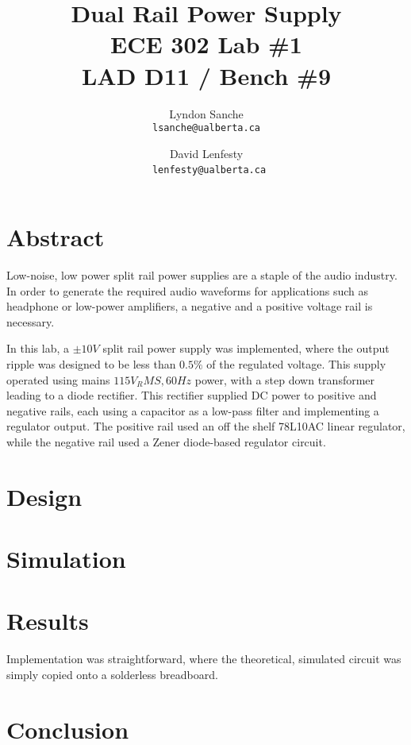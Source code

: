 \documentclass[12pt]{article}
\title{ {\Huge Dual Rail Power Supply } \\
    ECE 302 Lab \#1 \\ LAD D11 / Bench \#9}
\author{
    Lyndon Sanche\\
    \texttt{lsanche@ualberta.ca}
    \and
    David Lenfesty\\\
    \texttt{lenfesty@ualberta.ca}
}
\begin{document}

\maketitle
\newpage
\tableofcontents

\newpage
{}

\section{Abstract}

Low-noise, low power split rail power supplies are a staple of the audio industry.
In order to generate the required audio waveforms for applications such as headphone or
low-power amplifiers, a negative and a positive voltage rail is necessary.

In this lab, a $\pm 10 V$ split rail power supply was implemented,
where the output ripple was designed to be less than $ 0.5 \% $ of the
regulated voltage. This supply operated using mains $115 V_RMS, 60Hz $ power, with
a step down transformer leading to a diode rectifier. This rectifier supplied DC power to
positive and negative rails, each using a capacitor as a low-pass filter and implementing
a regulator output. The positive rail used an off the shelf 78L10AC linear regulator,
while the negative rail used a Zener diode-based regulator circuit.

\section{Design}

\section{Simulation}

\section{Results}

Implementation was straightforward, where the theoretical, simulated circuit was simply
copied onto a solderless breadboard. 

\section{Conclusion}
\end{document}
